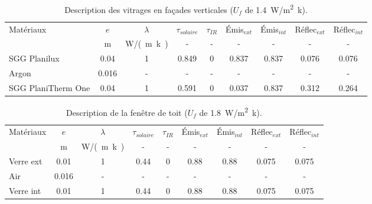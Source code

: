 \begin{table}
    \begin{tabular}{l *8{c}}
        \toprule
        Matériaux & $e$       & $\lambda$      & $\tau_{solaire}$ & $\tau_{IR}$ & Émis$_{ext}$ & Émis$_{int}$ & Réflec$_{ext}$ & Réflec$_{int}$ \\
                  & \si{m}  & \si{W/(m.k)} & -              & -         & -                & -                & -                & -                \\
        \midrule
        SGG Planilux       & 0.04  & 1          & 0.849      & 0           & 0.837              & 0.837              & 0.076              & 0.076                   \\
        Argon              & 0.016 & -          & -          & -           & -                  & -                  & -                  & -                       \\
        SGG PlaniTherm One & 0.04  & 1          & 0.591      & 0           & 0.037              & 0.837              & 0.312              & 0.264                   \\
        \bottomrule
    \end{tabular}
    \caption{Description des vitrages en façades verticales ($U_{f}$ de 1.4~\si{W/m^{2}.k}).}
    \label{tab:compo_vitrage}
\end{table}

\begin{table}
    \begin{tabular}{l *8{c}}
        \toprule
        Matériaux & $e$       & $\lambda$      & $\tau_{solaire}$ & $\tau_{IR}$ & Émis$_{ext}$ & Émis$_{int}$ & Réflec$_{ext}$ & Réflec$_{int}$  \\
                  & \si{m}  & \si{W/(m.k)} & -              & -         & -          & -          & -            & -             \\
        \midrule
        Verre ext & 0.01      & 1              & 0.44             & 0           & 0.88        & 0.88         & 0.075          & 0.075           \\
        Air       & 0.016     & -              & -                & -           & -           & -            & -              & -               \\
        Verre int & 0.01      & 1              & 0.44             & 0           & 0.88        & 0.88         & 0.075          & 0.075           \\
        \bottomrule
    \end{tabular}
    \caption{Description de la fenêtre de toit ($U_{f}$ de 1.8~\si{W/m^{2}.k}).}
    \label{tab:compo_velux}
\end{table}

